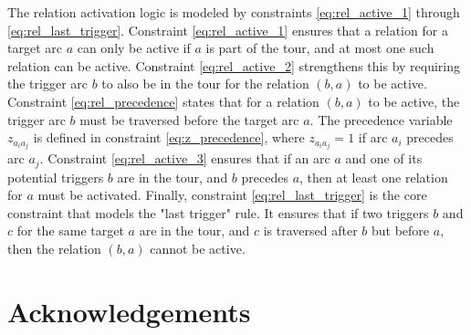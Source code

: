 \documentclass[twocolumn, switch]{article} %
\begin{document}
The relation activation logic is modeled by constraints \eqref{eq:rel_active_1} through \eqref{eq:rel_last_trigger}.
Constraint \eqref{eq:rel_active_1} ensures that a relation for a target arc $a$ can only be active if $a$ is part of the tour, and at most one such relation can be active.
Constraint \eqref{eq:rel_active_2} strengthens this by requiring the trigger arc $b$ to also be in the tour for the relation $(b,a)$ to be active.
Constraint \eqref{eq:rel_precedence} states that for a relation $(b,a)$ to be active, the trigger arc $b$ must be traversed before the target arc $a$.
The precedence variable $z_{a_ia_j}$ is defined in constraint \eqref{eq:z_precedence}, where $z_{a_ia_j}=1$ if arc $a_i$ precedes arc $a_j$.
Constraint \eqref{eq:rel_active_3} ensures that if an arc $a$ and one of its potential triggers $b$ are in the tour, and $b$ precedes $a$, then at least one relation for $a$ must be activated.
Finally, constraint \eqref{eq:rel_last_trigger} is the core constraint that models the "last trigger" rule. It ensures that if two triggers $b$ and $c$ for the same target $a$ are in the tour, and $c$ is traversed after $b$ but before $a$, then the relation $(b,a)$ cannot be active.


\footnotesize
\section*{Acknowledgements}

\normalsize



\end{document}
